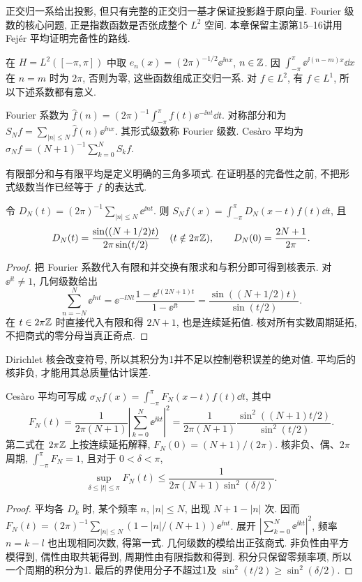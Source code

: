 \label{ch:fourier}
正交归一系给出投影, 但只有完整的正交归一基才保证投影趋于原向量. Fourier 级数的核心问题, 正是指数函数是否张成整个 $L^2$ 空间. 本章保留主源第15--16讲用 Fejér 平均证明完备性的路线.

在 $H=L^2([-\pi,\pi])$ 中取 $e_n(x)=(2\pi)^{-1/2}\ee^{\ii nx}$, $n\in\mathbb Z$. 因 $\int_{-\pi}^\pi\ee^{\ii(n-m)x}\dd x$ 在 $n=m$ 时为 $2\pi$, 否则为零, 这些函数组成正交归一系. 对 $f\in L^2$, 有 $f\in L^1$, 所以下述系数都有意义.

\begin{definition}
Fourier 系数为 $\widehat f(n)=(2\pi)^{-1}\int_{-\pi}^\pi f(t)\ee^{-\ii nt}\dd t$. 对称部分和为 $S_Nf=\sum_{|n|\le N}\widehat f(n)\ee^{\ii nx}$. 其形式级数称 Fourier 级数. Cesàro 平均为 $\sigma_Nf=(N+1)^{-1}\sum_{k=0}^NS_kf$.
\end{definition}
有限部分和与有限平均是定义明确的三角多项式. 在证明基的完备性之前, 不把形式级数当作已经等于 $f$ 的表达式.

\begin{proposition}
令 $D_N(t)=(2\pi)^{-1}\sum_{|n|\le N}\ee^{\ii nt}$. 则 $S_Nf(x)=\int_{-\pi}^\pi D_N(x-t)f(t)\dd t$, 且
\[
D_N(t)=\frac{\sin((N+1/2)t)}{2\pi\sin(t/2)}\quad(t\notin2\pi\mathbb Z),
\qquad D_N(0)=\frac{2N+1}{2\pi}.
\]
\end{proposition}
\begin{proof}
把 Fourier 系数代入有限和并交换有限求和与积分即可得到核表示. 对 $\ee^{\ii t}\ne1$, 几何级数给出
\[
\sum_{n=-N}^N\ee^{\ii nt}
=\ee^{-\ii Nt}\frac{1-\ee^{\ii(2N+1)t}}{1-\ee^{\ii t}}
=\frac{\sin((N+1/2)t)}{\sin(t/2)}.
\]
在 $t\in2\pi\mathbb Z$ 时直接代入有限和得 $2N+1$, 也是连续延拓值. 核对所有实数周期延拓, 不把商式的零分母当真正奇点.
\end{proof}
Dirichlet 核会改变符号, 所以其积分为1并不足以控制卷积误差的绝对值. 平均后的核非负, 才能用其总质量估计误差.

\begin{proposition}\label{prop:fejerkernel}
Cesàro 平均可写成 $\sigma_Nf(x)=\int_{-\pi}^\pi F_N(x-t)f(t)\dd t$, 其中
\[
F_N(t)=\frac1{2\pi(N+1)}\left|\sum_{k=0}^N\ee^{\ii kt}\right|^2
=\frac1{2\pi(N+1)}\frac{\sin^2((N+1)t/2)}{\sin^2(t/2)}.
\]
第二式在 $2\pi\mathbb Z$ 上按连续延拓解释, $F_N(0)=(N+1)/(2\pi)$. 核非负、偶、$2\pi$ 周期, $\int_{-\pi}^\pi F_N=1$, 且对于 $0<\delta<\pi$,
\[
\sup_{\delta\le|t|\le\pi}F_N(t)
\le\frac1{2\pi(N+1)\sin^2(\delta/2)}.
\]
\end{proposition}
\begin{proof}
平均各 $D_k$ 时, 某个频率 $n$, $|n|\le N$, 出现 $N+1-|n|$ 次. 因而 $F_N(t)=(2\pi)^{-1}\sum_{|n|\le N}(1-|n|/(N+1))\ee^{\ii nt}$. 展开 $|\sum_{k=0}^N\ee^{\ii kt}|^2$, 频率 $n=k-l$ 也出现相同次数, 得第一式. 几何级数的模给出正弦商式. 非负性由平方模得到, 偶性由取共轭得到, 周期性由有限指数和得到. 积分只保留零频率项, 所以一个周期的积分为1. 最后的界使用分子不超过1及 $\sin^2(t/2)\ge\sin^2(\delta/2)$.
\end{proof}

